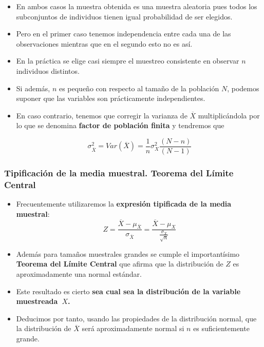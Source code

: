 \begin{frame}
\begin{itemize}
\item  En ambos casos la muestra obtenida es una muestra aleatoria  pues todos los
 subconjuntos de individuos tienen igual probabilidad de ser elegidos.
\item  Pero en el primer caso tenemos independencia entre cada una de las
 observaciones mientras que en el segundo esto no es así.
\end{itemize}
\end{frame}
\begin{frame}
\begin{itemize}
\item  En la práctica se elige casi siempre el muestreo consistente en
 observar $n$ individuos distintos.
\item  Si además, $n$ es pequeño con respecto al tamaño de la población $N$,
 podemos suponer que las variables son prácticamente independientes.
\item En caso contrario, tenemos que corregir la varianza  de $\overline{X}$ multiplicándola por lo que se
 denomina \textbf{factor de población finita} y tendremos que

 $$\sigma_{\overline{X}}^2=Var(\overline{X})=\frac{1}{n} \sigma_{X}^2 \frac{(N-n)}{(N-1)}$$
\end{itemize}
\end{frame}

\begin{frame}
\frametitle{Tipificación de la media muestral. Teorema del Límite Central}
\begin{itemize}
\item Frecuentemente utilizaremos la \textbf{expresión tipificada de la media muestral}:
 $$Z=\frac{\overline{X}-\mu_{\overline{X}}}{\sigma_{\overline{X}}}
 =\frac{\overline{X}-\mu_{X}}{\frac{\sigma_{X}}{\sqrt{n}}}$$
\item  Además para  tamaños muestrales grandes se cumple  el  importantísimo \textbf{Teorema del Límite Central} que afirma que  la
 distribución de $Z$ es aproximadamente una normal estándar.
\item  Este resultado es cierto \textbf{sea cual sea la distribución de la variable muestreada~$X$.}
\item Deducimos por tanto, usando las propiedades de la distribución normal, que la distribución de
  $\overline{X}$ será aproximadamente normal si $n$ es suficientemente grande.
\end{itemize}
\end{frame}

